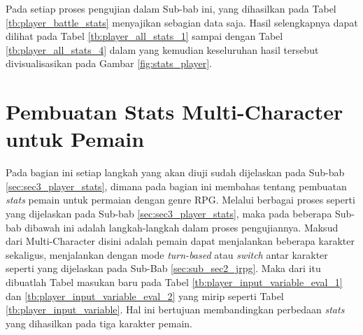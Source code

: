 Pada setiap proses pengujian dalam Sub-bab ini, yang dihasilkan pada Tabel \ref{tb:player_battle_stats} menyajikan sebagian data saja. Hasil selengkapnya dapat dilihat pada Tabel \ref{tb:player_all_stats_1} sampai dengan Tabel \ref{tb:player_all_stats_4} dalam  yang kemudian keseluruhan hasil tersebut divisualisasikan pada Gambar \ref{fig:stats_player}.
\vspace{1ex}

\section{Pembuatan Stats Multi-Character untuk Pemain}
\label{sec:sec4_eval_multi-character_player}
\vspace{1ex}

Pada bagian ini setiap langkah yang akan diuji sudah dijelaskan pada Sub-bab \ref{sec:sec3_player_stats}, dimana pada bagian ini membahas tentang pembuatan \textit{stats} pemain untuk permaian dengan genre RPG. Melalui berbagai proses seperti yang dijelaskan pada Sub-bab \ref{sec:sec3_player_stats}, maka pada beberapa Sub-bab dibawah ini adalah langkah-langkah dalam proses pengujiannya. Maksud dari Multi-Character disini adalah pemain dapat menjalankan beberapa karakter sekaligus, menjalankan dengan mode \textit{turn-based} atau \textit{switch} antar karakter seperti yang dijelaskan pada Sub-Bab \ref{sec:sub_sec2_jrpg}. Maka dari itu dibuatlah Tabel masukan baru pada Tabel \ref{tb:player_input_variable_eval_1} dan \ref{tb:player_input_variable_eval_2} yang mirip seperti Tabel \ref{tb:player_input_variable}. Hal ini bertujuan membandingkan perbedaan \textit{stats} yang dihasilkan pada tiga karakter pemain.
\vspace{-1ex}

